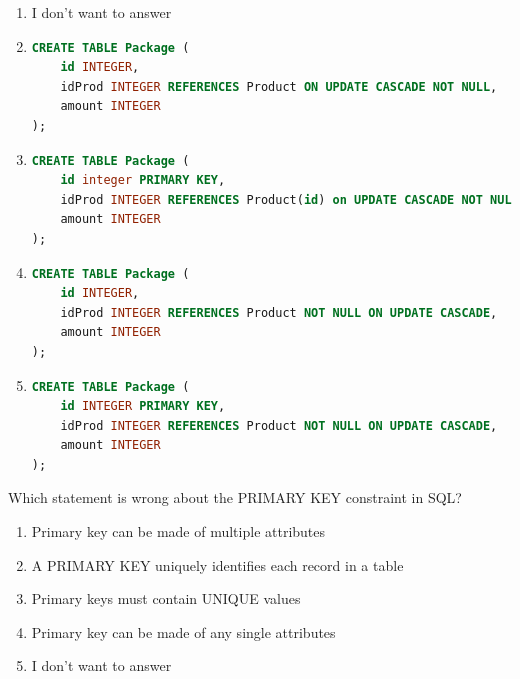 \documentclass{bdad}
\begin{document}
\begin{enumerate}
    \item I don't want to answer

    \item 
\begin{lstlisting}[language=SQL, numbers=none, frame=none, belowskip=0pt]
CREATE TABLE Package (
    id INTEGER,
    idProd INTEGER REFERENCES Product ON UPDATE CASCADE NOT NULL,
    amount INTEGER
);
\end{lstlisting}

    \item 
\begin{lstlisting}[language=SQL, numbers=none, frame=none, belowskip=0pt]
CREATE TABLE Package (
    id integer PRIMARY KEY, 
    idProd INTEGER REFERENCES Product(id) on UPDATE CASCADE NOT NULL, 
    amount INTEGER
);
\end{lstlisting}

    \item 
\begin{lstlisting}[language=SQL, numbers=none, frame=none, belowskip=0pt]
CREATE TABLE Package (
    id INTEGER, 
    idProd INTEGER REFERENCES Product NOT NULL ON UPDATE CASCADE, 
    amount INTEGER
);
\end{lstlisting}

    \item 
\begin{lstlisting}[language=SQL, numbers=none, frame=none, belowskip=0pt]
CREATE TABLE Package (
    id INTEGER PRIMARY KEY, 
    idProd INTEGER REFERENCES Product NOT NULL ON UPDATE CASCADE, 
    amount INTEGER
);
\end{lstlisting}
\end{enumerate}

Which statement is wrong about the PRIMARY KEY constraint in SQL?

\begin{enumerate}
    \item Primary key can be made of multiple attributes
    \item A PRIMARY KEY uniquely identifies each record in a table
    \item Primary keys must contain UNIQUE values
    \item Primary key can be made of any single attributes
    \item I don't want to answer
\end{enumerate}

\end{document}
